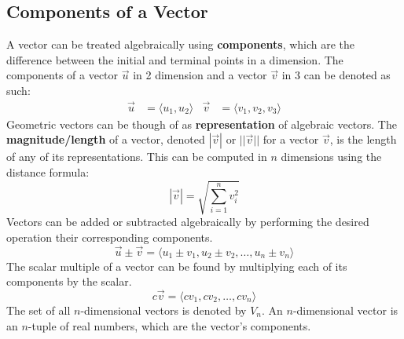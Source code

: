 \documentclass[../Calculus_\Roman{3}]{subfiles}
\begin{document}
		\subsection*{Components of a Vector}
			A vector can be treated algebraically using \textbf{components}, which are the difference between the initial and terminal points in a dimension. The components of a vector $\vec{u}$ in 2 dimension and a vector $\vec{v}$ in 3 can be denoted as such:
			\begin{align*}
				\vec{u} &= \langle u_1, u_2 \rangle & \vec{v} &= \langle v_1, v_2, v_3 \rangle
			\end{align*}
			Geometric vectors can be though of as \textbf{representation} of algebraic vectors.
			The \textbf{magnitude/length} of a vector, denoted $|\vec{v}|$ or $||\vec{v}||$ for a vector $\vec{v}$, is the length of any of its representations. This can be computed in $n$ dimensions using the distance formula:
			\[|\vec{v}| = \sqrt{\sum_{i = 1}^n v_i^2}\]
			Vectors can be added or subtracted algebraically by performing the desired operation their corresponding components.
			\[\vec{u} \pm \vec{v} = \langle u_1 \pm v_1, u_2 \pm v_2, \ldots, u_n \pm v_n \rangle\]
			The scalar multiple of a vector can be found by multiplying each of its components by the scalar.
			\[c\vec{v} = \langle cv_1, cv_2, \ldots, cv_n \rangle\]
			The set of all $n$-dimensional vectors is denoted by $V_n$.
			An $n$-dimensional vector is an $n$-tuple of real numbers, which are the vector's components.
\end{document}

